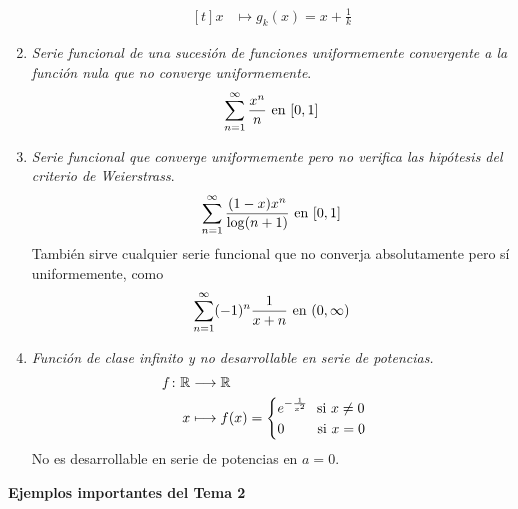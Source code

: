 \documentclass[12pt]{report}
\theoremstyle{definition}
\theoremstyle{definition}
\theoremstyle{remark}
\newcommand{\R}{\mathbb R}
\begin{document}
\begin{enumerate}[leftmargin=*]
\[\begin{aligned}[t]
    x &\longmapsto g_k(x)=x+\frac{1}{k}
    \end{aligned}
    \]
    \item \textit{Serie funcional de una sucesión de funciones uniformemente convergente a la función nula que no converge uniformemente}.
    \[\sum_{n=1}^\infty \frac{x^n}{n} \ \textup{en} \ [0,1]\]
    \item \textit{Serie funcional que converge uniformemente pero no verifica las hipótesis del criterio de Weierstrass}.
    \[\sum_{n=1}^\infty \frac{(1-x)x^n}{\log(n+1)} \ \textup{en} \ [0,1]\]
    También sirve cualquier serie funcional que no converja absolutamente pero sí uniformemente, como
    \[\sum_{n=1}^\infty (-1)^n \frac{1}{x+n} \ \textup{en} \ (0,\infty)\]
    \item \textit{Función de clase infinito y no desarrollable en serie de potencias.}
    \[
    \begin{aligned}[t]
    f \colon \R &\longrightarrow \R \\
    x &\longmapsto f(x)=\begin{cases}
        e^{-\frac{1}{x^2}} $\ \ si $ x\neq 0 \\
        0 \phantom{^{-\frac{1}{x^2}}} $\ \ si $ x = 0
    \end{cases}
    \end{aligned}
    \]
    No es desarrollable en serie de potencias en $a = 0$.
\end{enumerate}

\thispagestyle{empty}

\pagebreak

\thispagestyle{empty}

\begin{center}
    \textbf{Ejemplos importantes del Tema 2}
\end{center}
\end{document}
